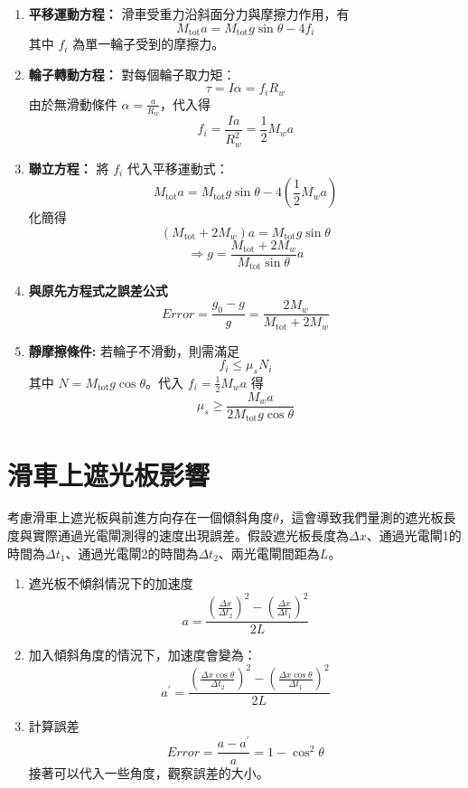 \documentclass[12pt]{article}
\begin{document}
\begin{enumerate}

    \item \textbf{平移運動方程：}  
    滑車受重力沿斜面分力與摩擦力作用，有
    \[
        M_{\text{tot}} a = M_{\text{tot}} g \sin\theta - 4 f_i
    \]
    其中 $f_i$ 為單一輪子受到的摩擦力。

    \item \textbf{輪子轉動方程：} 
    對每個輪子取力矩：
    \[
    \tau = I \alpha = f_i R_w
    \]
    由於無滑動條件 $\alpha = \frac{a}{R_w}$，代入得
    \[
    f_i = \frac{I a}{R_w^2} = \frac{1}{2} M_w a
    \]

    \item \textbf{聯立方程：}
    將 $f_i$ 代入平移運動式：
    \[
    M_{\text{tot}} a = M_{\text{tot}} g \sin\theta - 4 \left( \frac{1}{2} M_w a \right)
    \]
    化簡得
    \[
    (M_{\text{tot}} + 2M_w)a = M_{\text{tot}} g \sin\theta
    \]
    \[
    \Rightarrow \boxed{g = \frac{M_{\text{tot}}+2M_w}{M_{\text{tot}}\sin\theta}  a}
    \] 

    \item \textbf{與原先方程式之誤差公式}
    \[
    Error= \frac{g_0-g}{g}=\frac{2M_w}{M_{\text{tot}}+2M_w}
    \]
    

    \item \textbf{靜摩擦條件:} 
    若輪子不滑動，則需滿足
    \[
    f_i \le \mu_s N_i
    \]
    其中 $N=M_{\text{tot}} g \cos\theta$。代入 $f_i = \frac{1}{2} M_w a$ 得
    \[
    \mu_s \ge \frac{M_w a}{2M_{\text{tot}} g \cos\theta}
    \]

\end{enumerate}


\section*{滑車上遮光板影響}
\noindent
考慮滑車上遮光板與前進方向存在一個傾斜角度$\theta$，這會導致我們量測的遮光板長度與實際通過光電閘測得的速度出現誤差。假設遮光板長度為$\Delta x$、通過光電閘1的時間為$\Delta t_1$、通過光電閘2的時間為$\Delta t_2$、兩光電閘間距為$L$。

\begin{enumerate}
    \item 遮光板不傾斜情況下的加速度
    \[
    a=\frac{(\frac{\Delta x}{\Delta t_2})^2-(\frac{\Delta x}{\Delta t_1})^2}{2L}
    \]
    \item 加入傾斜角度的情況下，加速度會變為：
    \[
    a^\prime=\frac{(\frac{\Delta x\cos \theta}{\Delta t_2})^2-(\frac{\Delta x \cos \theta}{\Delta t_1})^2}{2L} 
    \]
    \item 計算誤差
    \[
    Error=\frac{a-a^\prime}{a}=1-\cos^2 \theta
    \]
    接著可以代入一些角度，觀察誤差的大小。
    
\end{enumerate}
\end{document}
